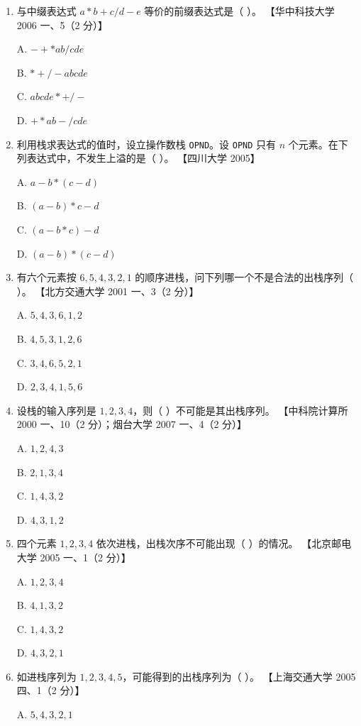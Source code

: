 \documentclass[lang=cn,newtx,10pt,scheme=chinese]{elegantbook}
\begin{document}
\begin{enumerate}
    \item 与中缀表达式 $a * b + c / d - e$ 等价的前缀表达式是（ ）。  
    【华中科技大学 2006 一、5（2 分）】  

    A. $- + * a b / c d e$  

    B. $* + /-a b  c d  e$  

    C. $a b c d  e *+/-$  

    D. $+ * a b - / c d e$  

    \item 利用栈求表达式的值时，设立操作数栈 \texttt{OPND}。设 \texttt{OPND} 只有 $n$ 个元素。在下列表达式中，不发生上溢的是（ ）。  
    【四川大学 2005】  

    A. $a - b * (c - d)$  

    B. $(a - b) * c - d$  

    C. $(a - b * c) - d$  

    D. $(a - b) * (c - d)$  

    \item 有六个元素按 $6, 5, 4, 3, 2, 1$ 的顺序进栈，问下列哪一个不是合法的出栈序列（ ）。  
    【北方交通大学 2001 一、3（2 分）】  

    A. $5, 4, 3, 6, 1, 2$  

    B. $4, 5, 3, 1, 2, 6$  

    C. $3, 4, 6, 5, 2, 1$ 

    D. $2, 3, 4, 1, 5, 6$  

    \item 设栈的输入序列是 $1, 2, 3, 4$，则（ ）不可能是其出栈序列。  
    【中科院计算所 2000 一、10（2 分）；烟台大学 2007 一、4（2 分）】  

    A. $1, 2, 4, 3$  

    B. $2, 1, 3, 4$  

    C. $1, 4, 3, 2$  

    D. $4, 3, 1, 2$  

    \item 四个元素 $1, 2, 3, 4$ 依次进栈，出栈次序不可能出现（ ）的情况。  
    【北京邮电大学 2005 一、1（2 分）】  

    A. $1, 2, 3, 4$  

    B. $4, 1, 3, 2$  

    C. $1, 4, 3, 2$  

    D. $4, 3, 2, 1$ 

    \item 如进栈序列为 $1, 2, 3, 4, 5$，可能得到的出栈序列为（ ）。  
    【上海交通大学 2005 四、1（2 分）】  

    A. $5, 4, 3, 2, 1$  


\end{enumerate}
\end{document}
